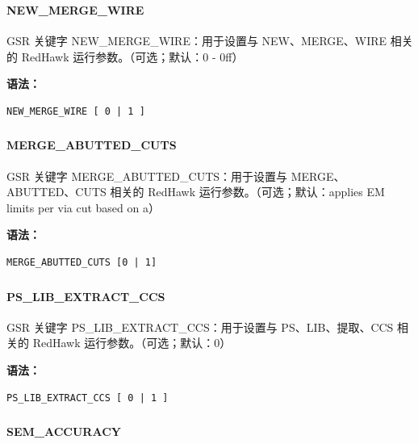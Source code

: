 \subsubsection{}
\paragraph*{NEW_MERGE_WIRE}

GSR 关键字 NEW_MERGE_WIRE：用于设置与 NEW、MERGE、WIRE 相关的 RedHawk 运行参数。（可选；默认：0 - 0ff）

\textbf{语法：}
\begin{lstlisting}
NEW_MERGE_WIRE [ 0 | 1 ]
\end{lstlisting}

\subsubsection{}
\paragraph*{MERGE_ABUTTED_CUTS}

GSR 关键字 MERGE_ABUTTED_CUTS：用于设置与 MERGE、ABUTTED、CUTS 相关的 RedHawk 运行参数。（可选；默认：applies EM limits per via cut based on a）

\textbf{语法：}
\begin{lstlisting}
MERGE_ABUTTED_CUTS [0 | 1]
\end{lstlisting}

\subsubsection{}
\paragraph*{PS_LIB_EXTRACT_CCS}

GSR 关键字 PS_LIB_EXTRACT_CCS：用于设置与 PS、LIB、提取、CCS 相关的 RedHawk 运行参数。（可选；默认：0）

\textbf{语法：}
\begin{lstlisting}
PS_LIB_EXTRACT_CCS [ 0 | 1 ]
\end{lstlisting}

\subsubsection{}
\paragraph*{SEM_ACCURACY}

